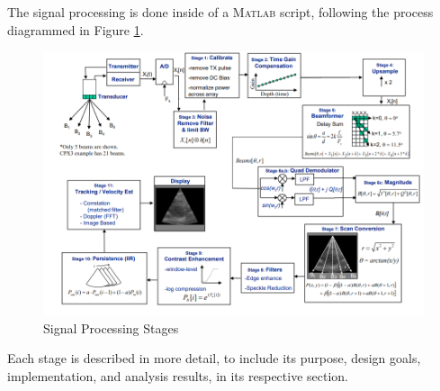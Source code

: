 The signal processing is done inside of a \textsc{Matlab} script, following the process diagrammed in Figure \ref{fig:stages}. 

\begin{figure}[H]
    \centering
    \includegraphics[width=0.75\linewidth]{figures/stages.png}
    \caption{Signal Processing Stages}
    \label{fig:stages}
\end{figure}

Each stage is described in more detail, to include its purpose, design goals, implementation, and analysis results, in its respective section.